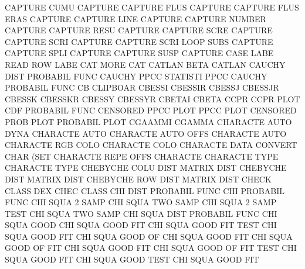 CAPTURE  CUMU                           CAPTURE
CAPTURE  FLUS                           CAPTURE
CAPTURE  FLUS ERAS                      CAPTURE
CAPTURE  LINE                           CAPTURE
CAPTURE  NUMBER                         CAPTURE
CAPTURE  RESU                           CAPTURE
CAPTURE  SCRE                           CAPTURE
CAPTURE  SCRI                           CAPTURE
CAPTURE  SCRI LOOP SUBS                 CAPTURE
CAPTURE  SPLI                           CAPTURE
CAPTURE  SUSP                           CAPTURE
CASE     LABE                           READ     ROW  LABE
CAT      MORE                           CAT
CATLAN   BETA                           CATLAN
CAUCHY   DIST                           PROBABIL FUNC
CAUCHY   PPCC                           STATISTI PPCC
CAUCHY                                  PROBABIL FUNC
CB                                      CLIPBOAR
CBESSI                                  CBESSIR
CBESSJ                                  CBESSJR
CBESSK                                  CBESSKR
CBESSY                                  CBESSYR
CBETAI                                  CBETA
CCPR                                    CCPR     PLOT
CDF                                     PROBABIL FUNC
CENSORED PPCC PLOT                      PPCC     PLOT
CENSORED PROB PLOT                      PROBABIL PLOT
CGAAMMI                                 CGAMMA
CHARACTE AUTO DYNA                      CHARACTE AUTO
CHARACTE AUTO OFFS                      CHARACTE AUTO
CHARACTE RGB  COLO                      CHARACTE COLO
CHARACTE DATA                           CONVERT  CHAR (SET
CHARACTE REPE OFFS                      CHARACTE
CHARACTE TYPE                           CHARACTE TYPE
CHEBYCHE COLU DIST                      MATRIX   DIST
CHEBYCHE DIST                           MATRIX   DIST
CHEBYCHE ROW  DIST                      MATRIX   DIST
CHECK    CLASS                          DEX      CHEC CLASS
CHI      DIST                           PROBABIL FUNC
CHI                                     PROBABIL FUNC
CHI      SQUA 2    SAMP                 CHI      SQUA TWO  SAMP
CHI      SQUA 2    SAMP TEST            CHI      SQUA TWO  SAMP
CHI      SQUA DIST                      PROBABIL FUNC
CHI      SQUA GOOD                      CHI      SQUA GOOD FIT
CHI      SQUA GOOD FIT  TEST            CHI      SQUA GOOD FIT
CHI      SQUA GOOD OF                   CHI      SQUA GOOD FIT
CHI      SQUA GOOD OF   FIT             CHI      SQUA GOOD FIT
CHI      SQUA GOOD OF   FIT  TEST       CHI      SQUA GOOD FIT
CHI      SQUA GOOD TEST                 CHI      SQUA GOOD FIT

